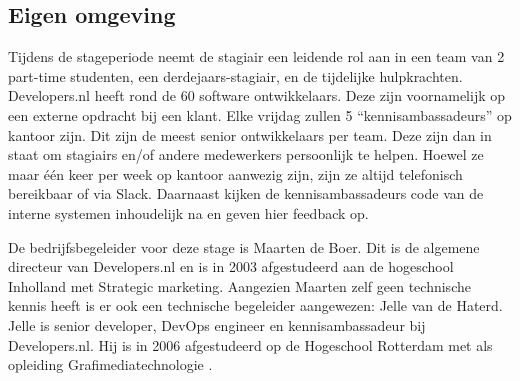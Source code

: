 \subsection{Eigen omgeving}

Tijdens de stageperiode neemt de stagiair een leidende rol aan in een team van 2 part-time studenten, een derdejaars-stagiair, en de tijdelijke hulpkrachten. Developers.nl heeft rond de 60 software ontwikkelaars. Deze zijn voornamelijk op een externe opdracht bij een klant. Elke vrijdag zullen 5 \enquote{kennisambassadeurs} op kantoor zijn. Dit zijn de meest senior ontwikkelaars per team. Deze zijn dan in staat om stagiairs en/of andere medewerkers persoonlijk te helpen. Hoewel ze maar één keer per week op kantoor aanwezig zijn, zijn ze altijd telefonisch bereikbaar of via Slack. Daarnaast kijken de kennisambassadeurs code van de interne systemen inhoudelijk na en geven hier feedback op.

De bedrijfsbegeleider voor deze stage is Maarten de Boer. Dit is de algemene directeur van Developers.nl en is in 2003 afgestudeerd aan de hogeschool Inholland met Strategic marketing. Aangezien Maarten zelf geen technische kennis heeft is er ook een technische begeleider aangewezen: Jelle van de Haterd. Jelle is senior developer, DevOps engineer en kennisambassadeur bij Developers.nl. Hij is in 2006 afgestudeerd op de Hogeschool Rotterdam met als opleiding Grafimediatechnologie \parencite{Afstudeervoorstel}.